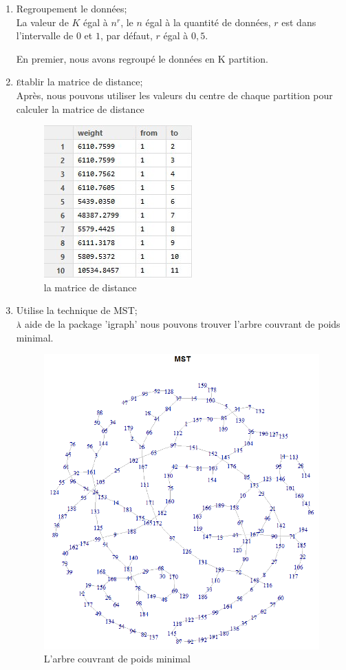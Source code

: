   \begin{enumerate}
  \item Regroupement le données;\\
  
   La valeur de $K$ égal à $n^r$, le $n$ égal à la quantité de données, $r$ est dans l'intervalle de $0$ et $1$, par défaut, $r$ égal à $0,5$.
   
   En premier, nous avons regroupé le données en K partition.
   
  \item \textsc{é}tablir la matrice de distance;\\
  
  Après, nous pouvons utiliser les valeurs du centre de chaque partition pour calculer la matrice de distance
  \begin{figure}[H]
\centering
\includegraphics[width=0.4\linewidth]{images/distance}
\caption{la matrice de distance}
\label{fig:distance}
\end{figure}

  
  \item Utilise la technique de MST;\\
  
  \textsc{à} aide de la package 'igraph' nous pouvons trouver l'arbre couvrant de poids minimal.
  
  \begin{figure}[H]
\centering
\includegraphics[width=0.45\linewidth]{images/mst2}
\caption{L'arbre couvrant de poids minimal}
\label{fig:mst2}
\end{figure}


\end{enumerate}
